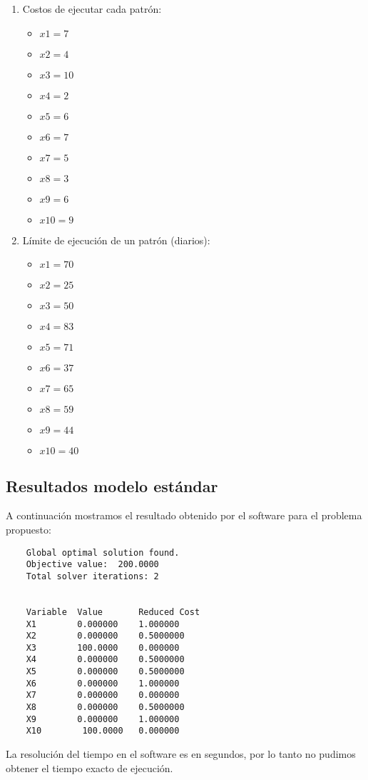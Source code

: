 \documentclass[journal, 10pt]{IEEEtran}
\begin{document}
			\begin{enumerate}
			\item 
				Costos de ejecutar cada patrón:
				\begin{itemize}
					\item
						$x1 = 7$
					\item
						$x2 = 4$
					\item
						$x3 = 10$   
					\item
						$x4 = 2  $
					\item
						$x5 = 6$
					\item
						$x6 = 7 $  
					\item
						$x7 = 5$
					\item
						$x8 = 3$
					\item
						$x9 = 6$
					\item
						$x10 = 9$
				\end{itemize}
			\item 
				Límite de ejecución de un patrón (diarios):
				\begin{itemize}
					\item
						$x1 = 70$
					\item
						$x2 = 25$
					\item
						$x3 = 50$   
					\item
						$x4 = 83  $
					\item
						$x5 = 71$
					\item
						$x6 = 37 $  
					\item
						$x7 = 65$
					\item
						$x8 = 59$
					\item
						$x9 = 44$
					\item
						$x10 = 40$
				\end{itemize}
			\end{enumerate}
	\subsection{Resultados modelo estándar} 
		A continuación mostramos el resultado obtenido por el software para
		el problema propuesto:
		\begin{verbatim}
    Global optimal solution found.
    Objective value:  200.0000
    Total solver iterations: 2
    
    
    Variable  Value       Reduced Cost
    X1        0.000000    1.000000
    X2        0.000000    0.5000000
    X3        100.0000    0.000000
    X4        0.000000    0.5000000
    X5        0.000000    0.5000000
    X6        0.000000    1.000000
    X7        0.000000    0.000000
    X8        0.000000    0.5000000
    X9        0.000000    1.000000
    X10        100.0000   0.000000
		\end{verbatim}
		La resolución del tiempo en el software es en segundos, por
		lo tanto no pudimos obtener el tiempo exacto de ejecución.
\end{document}
